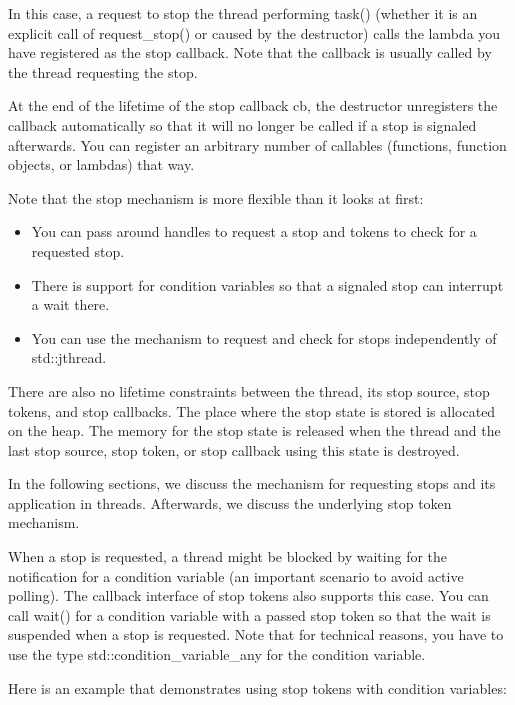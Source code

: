 In this case, a request to stop the thread performing task() (whether it is an explicit call of request\_stop() or caused by the destructor) calls the lambda you have registered as the stop callback. Note that the callback is usually called by the thread requesting the stop.

At the end of the lifetime of the stop callback cb, the destructor unregisters the callback automatically so that it will no longer be called if a stop is signaled afterwards. You can register an arbitrary number of callables (functions, function objects, or lambdas) that way.

Note that the stop mechanism is more flexible than it looks at first:

\begin{itemize}
\item 
You can pass around handles to request a stop and tokens to check for a requested stop.

\item 
There is support for condition variables so that a signaled stop can interrupt a wait there.

\item 
You can use the mechanism to request and check for stops independently of std::jthread.
\end{itemize}

There are also no lifetime constraints between the thread, its stop source, stop tokens, and stop callbacks. The place where the stop state is stored is allocated on the heap. The memory for the stop state is released when the thread and the last stop source, stop token, or stop callback using this state is destroyed.

In the following sections, we discuss the mechanism for requesting stops and its application in threads. Afterwards, we discuss the underlying stop token mechanism.


When a stop is requested, a thread might be blocked by waiting for the notification for a condition variable (an important scenario to avoid active polling). The callback interface of stop tokens also supports this case. You can call wait() for a condition variable with a passed stop token so that the wait is suspended when a stop is requested. Note that for technical reasons, you have to use the type std::condition\_variable\_any for the condition variable.

Here is an example that demonstrates using stop tokens with condition variables:


